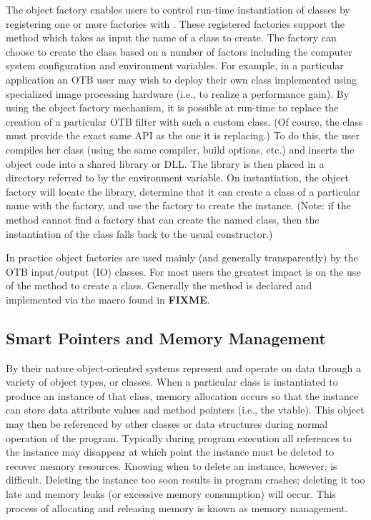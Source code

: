 The object factory enables users to control run-time instantiation of classes
by registering one or more factories with . These
registered factories support the method 
which takes as input the name of a class to create. The factory can choose to
create the class based on a number of factors including the computer system
configuration and environment variables. For example, in a particular
application an OTB user may wish to deploy their own class implemented using
specialized image processing hardware (i.e., to realize a performance
gain). By using the object factory mechanism, it is possible at run-time to
replace the creation of a particular OTB filter with such a custom class. (Of
course, the class must provide the exact same API as the one it is
replacing.) To do this, the user compiles her class (using the same compiler,
build options, etc.) and inserts the object code into a shared library or
DLL. The library is then placed in a directory referred to by the
 environment variable. On instantiation, the object
factory will locate the library, determine that it can create a class of a
particular name with the factory, and use the factory to create the
instance. (Note: if the  method cannot find a factory
that can create the named class, then the instantiation of the class falls
back to the usual constructor.)

In practice object factories are used mainly (and generally transparently) by
the OTB input/output (IO) classes. For most users the greatest impact is on
the use of the  method to create a class. Generally the
 method is declared and implemented via the macro
 found in \textbf{FIXME}.


\subsection{Smart Pointers and Memory Management}
\label{sec:SmartPointers}


By their nature object-oriented systems represent and operate on data through
a variety of object types, or classes. When a particular class is
instantiated to produce an instance of that class, memory allocation occurs
so that the instance can store data attribute values and method pointers
(i.e., the vtable). This object may then be referenced by other classes or
data structures during normal operation of the program. Typically during
program execution all references to the instance may disappear at which point
the instance must be deleted to recover memory resources. Knowing when to
delete an instance, however, is difficult. Deleting the instance too soon
results in program crashes; deleting it too late and memory leaks (or
excessive memory consumption) will occur. This process of allocating and
releasing memory is known as memory management.

